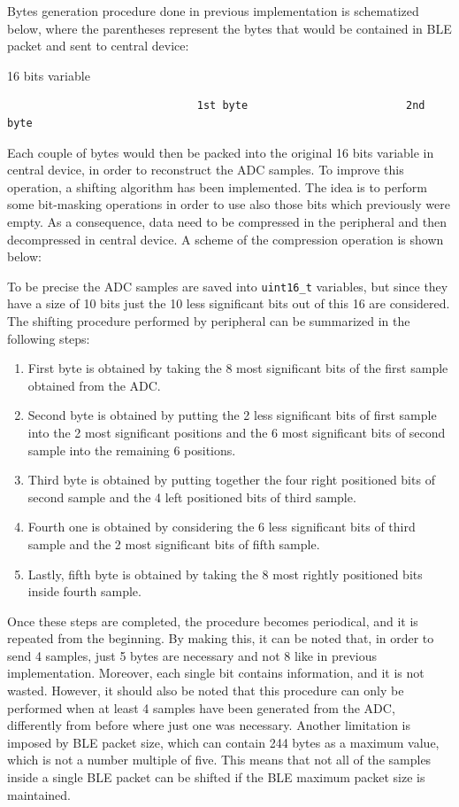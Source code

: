\documentclass{Configuration_Files/PoliMi3i_thesis}
\begin{document}
Bytes generation procedure done in previous implementation is schematized below, where the parentheses represent the bytes that would be contained in BLE packet and sent to central device:

\begin{center}
16 bits variable
\end{center}

\begin{verbatim}
                              1st byte                         2nd byte
\end{verbatim}

Each couple of bytes would then be packed into the original 16 bits variable in central device, in order to reconstruct the ADC samples. To improve this operation, a shifting algorithm has been implemented. The idea is to perform some bit-masking operations in order to use also those bits which previously were empty. As a consequence, data need to be compressed in the peripheral and then decompressed in central device. A scheme of the compression operation is shown below:

To be precise the ADC samples are saved into \texttt{uint16\_t} variables, but since they have a size of 10 bits just the 10 less significant bits out of this 16 are considered. The shifting procedure performed by peripheral can be summarized in the following steps:

\begin{enumerate}
    \item First byte is obtained by taking the 8 most significant bits of the first sample obtained from the ADC.
    \item Second byte is obtained by putting the 2 less significant bits of first sample into the 2 most significant positions and the 6 most significant bits of second sample into the remaining 6 positions.
    \item Third byte is obtained by putting together the four right positioned bits of second sample and the 4 left positioned bits of third sample.
    \item Fourth one is obtained by considering the 6 less significant bits of third sample and the 2 most significant bits of fifth sample.
    \item Lastly, fifth byte is obtained by taking the 8 most rightly positioned bits inside fourth sample.
\end{enumerate}

Once these steps are completed, the procedure becomes periodical, and it is repeated from the beginning. By making this, it can be noted that, in order to send 4 samples, just 5 bytes are necessary and not 8 like in previous implementation. Moreover, each single bit contains information, and it is not wasted. However, it should also be noted that this procedure can only be performed when at least 4 samples have been generated from the ADC, differently from before where just one was necessary. Another limitation is imposed by BLE packet size, which can contain 244 bytes as a maximum value, which is not a number multiple of five. This means that not all of the samples inside a single BLE packet can be shifted if the BLE maximum packet size is maintained.
\end{document}
